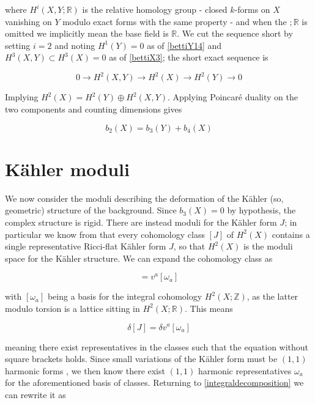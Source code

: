 where $H^i(X,Y;\mathbb{R})$ is the relative homology group - closed $k$-forms on $X$ vanishing on $Y$ modulo exact forms with the same property - and when the $;\mathbb{R}$ is omitted we implicitly mean the base field is $\mathbb{R}$. We cut the sequence short by setting $i=2$ and noting $H^1(Y) = 0$ as of \ref{bettiY14} and $H^3(X,Y) \subset H^3(X) = 0$ as of \ref{bettiX3}; the short exact sequence is

\begin{equation}
	0 \rightarrow H^2(X,Y) \rightarrow H^2(X) \rightarrow H^2(Y) \rightarrow 0
\end{equation}

Implying $H^2(X) = H^2(Y) \oplus H^2(X,Y)$. Applying Poincaré duality on the two components and counting dimensions gives

\begin{equation}
	b_2(X) = b_3(Y) + b_4(X) \label{bettidentity}
\end{equation}
\section{K\"ahler moduli}

We now consider the moduli describing the deformation of the K\"ahler (so, geometric) structure of the background. Since $b_3(X) = 0$ by hypothesis, the complex structure is rigid. There are instead moduli for the K\"ahler form $J$; in particular we know from  that every cohomology class $[J]$ of $H^2(X)$ contains a single representative Ricci-flat K\"ahler form $J$, so that $H^2(X)$ is the moduli space for the K\"ahler structure. We can expand the cohomology class as

\begin{equation}
	[J] = v^a [\omega_a] \label{integraldecomposition}
\end{equation}

with $[\omega_a]$ being a basis for the integral cohomology $H^2(X;\mathbb Z)$, as the latter modulo torsion is a lattice sitting in $H^2(X;\mathbb R)$. This means

\begin{equation}
	\delta [J] = \delta v^a [\omega_a]
\end{equation}

meaning there exist representatives in the classes such that the equation without square brackets holds. Since small variations of the K\"ahler form must be $(1,1)$ harmonic forms , we then know there exist $(1,1)$ harmonic representatives $\omega_a$ for the aforementioned basis of classes. Returning to \ref{integraldecomposition} we can rewrite it as

